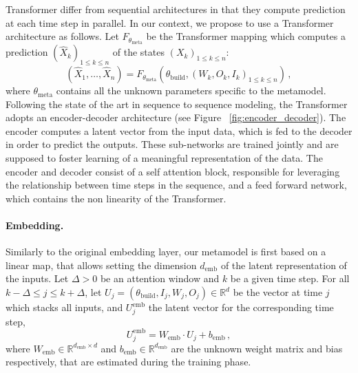 \documentclass[12pt]{article}
\newcommand{\eqsp}{\,}
\begin{document}
Transformer differ from sequential architectures in that they compute prediction at each time step in parallel. In our context, we propose to use a Transformer architecture as follows. Let $F_{\theta_{\mathrm{meta}}}$ be the Transformer mapping which computes a prediction  $(\widehat X_{k})_{1\leqslant k\leqslant n}$ of the states $(X_{k})_{1\leqslant k\leqslant n}$:
$$
    (\widehat X_1,\ldots,\widehat X_n) = F_{\theta_{\mathrm{meta}}}(\theta_{\mathrm{build}}, (W_k,O_k,I_k)_{1\leqslant k\leqslant n})\,,
$$
where $\theta_{\mathrm{meta}}$ contains all the unknown parameters specific to the metamodel.
Following the state of the art in sequence to sequence modeling, the Transformer  adopts an encoder-decoder architecture (see Figure ~\ref{fig:encoder_decoder}). The encoder computes a latent vector from the input data, which is fed to the decoder in order to predict the outputs. These sub-networks are trained jointly and are supposed to foster learning of a meaningful representation of the data. The encoder and decoder consist of a self attention block, responsible for leveraging the relationship between time steps in the sequence, and a feed forward network, which contains the non linearity of the Transformer.

\paragraph{Embedding.}
Similarly to the original embedding layer,  our metamodel is first based on a linear map, that allows setting the dimension $d_{\mathrm{emb}}$ of the latent representation of the inputs.
Let $\Delta >0$ be an  attention window and $k$ be a given time step. For all $k-\Delta \leqslant j\leqslant k+\Delta$, let $U_j = (\theta_{\mathrm{build}}, I_j, W_j, O_j)\in\mathbb{R}^d$ be the vector at time $j$ which stacks all inputs, and $U^{\mathrm{emb}}_j$ the latent vector for the corresponding time step,
$$
    U^{\mathrm{emb}}_j = W_{\mathrm{emb}} \cdot U_j + b_{\mathrm{emb}}\eqsp,
$$
where $W_{\mathrm{emb}}\in\mathbb{R}^{d_{\mathrm{emb}}\times d}$ and $b_{\mathrm{emb}}\in\mathbb{R}^{d_{\mathrm{emb}}}$ are the unknown weight matrix and bias respectively, that are estimated during the training phase.
\end{document}
